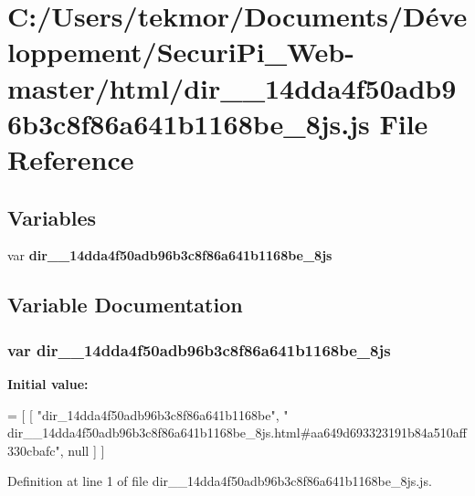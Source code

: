 \section{C\+:/\+Users/tekmor/\+Documents/\+Développement/\+Securi\+Pi\+\_\+\+Web-\/master/html/dir\+\_\+\+\_\+14dda4f50adb96b3c8f86a641b1168be\+\_\+8js.js File Reference}
\label{dir____14dda4f50adb96b3c8f86a641b1168be__8js_8js}
\subsection*{Variables}
\begin{DoxyCompactItemize}
\item 
var {\bf dir\+\_\+\+\_\+14dda4f50adb96b3c8f86a641b1168be\+\_\+8js}
\end{DoxyCompactItemize}


\subsection{Variable Documentation}
\subsubsection[{dir\+\_\+\+\_\+14dda4f50adb96b3c8f86a641b1168be\+\_\+8js}]{\setlength{\rightskip}{0pt plus 5cm}var dir\+\_\+\+\_\+14dda4f50adb96b3c8f86a641b1168be\+\_\+8js}\label{dir____14dda4f50adb96b3c8f86a641b1168be__8js_8js_a118978e54d5f956513ead4d696784f67}
{\bfseries Initial value\+:}
\begin{DoxyCode}
=
[
    [ \textcolor{stringliteral}{"dir\_14dda4f50adb96b3c8f86a641b1168be"}, \textcolor{stringliteral}{"
      dir\_\_14dda4f50adb96b3c8f86a641b1168be\_8js.html#aa649d693323191b84a510aff330cbafc"}, null ]
]
\end{DoxyCode}


Definition at line 1 of file dir\+\_\+\+\_\+14dda4f50adb96b3c8f86a641b1168be\+\_\+8js.\+js.


